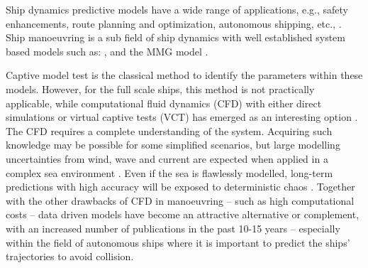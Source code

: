 Ship dynamics predictive models have a wide range of applications, e.g., safety enhancements, route planning and optimization, autonomous shipping, etc., \citep{aslam_internet_2020}.
Ship manoeuvring is a sub field of ship dynamics with well established system based models such as: \citet{abkowitz_ship_1964,nomoto_steering_1957,norrbin_theory_1971}, and the MMG model \citep{yasukawa_introduction_2015}.

Captive model test is the classical method to identify the parameters within these models. However, for the full scale ships, this method is not practically applicable, while computational fluid dynamics (CFD) with either direct simulations or virtual captive tests (VCT) has emerged as an interesting option \citep{liu_predictions_2018,li_ship_2022}.
The CFD requires a complete understanding of the system. Acquiring such knowledge may be possible for some simplified scenarios, but large modelling uncertainties from wind, wave and current are expected when applied in a complex sea environment \citep{miller_ship_2021}. 
Even if the sea is flawlessly modelled, long-term predictions with high accuracy will be exposed to deterministic chaos \citep{lorenz_deterministic_1963}.
Together with the other drawbacks of CFD in manoeuvring -- such as high computational costs -- data driven models have become an attractive alternative or complement, with an increased number of publications in the past 10-15 years %
-- especially within the field of autonomous ships \citep{ahmed_survey_2023} where it is important to predict the ships’ trajectories to avoid collision. 


